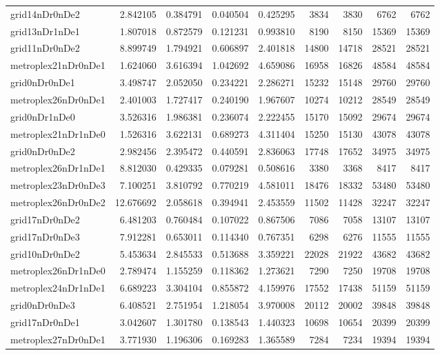 \begin{longtable}{|l|r|r|r|r|r|r|r|r|}
grid14nDr0nDe2 & 2.842105 & 0.384791 & 0.040504 & 0.425295 & 3834 & 3830 & 6762 & 6762 \\
grid13nDr1nDe1 & 1.807018 & 0.872579 & 0.121231 & 0.993810 & 8190 & 8150 & 15369 & 15369 \\
grid11nDr0nDe2 & 8.899749 & 1.794921 & 0.606897 & 2.401818 & 14800 & 14718 & 28521 & 28521 \\
metroplex21nDr0nDe1 & 1.624060 & 3.616394 & 1.042692 & 4.659086 & 16958 & 16826 & 48584 & 48584 \\
grid0nDr0nDe1 & 3.498747 & 2.052050 & 0.234221 & 2.286271 & 15232 & 15148 & 29760 & 29760 \\
metroplex26nDr0nDe1 & 2.401003 & 1.727417 & 0.240190 & 1.967607 & 10274 & 10212 & 28549 & 28549 \\
grid0nDr1nDe0 & 3.526316 & 1.986381 & 0.236074 & 2.222455 & 15170 & 15092 & 29674 & 29674 \\
metroplex21nDr1nDe0 & 1.526316 & 3.622131 & 0.689273 & 4.311404 & 15250 & 15130 & 43078 & 43078 \\
grid0nDr0nDe2 & 2.982456 & 2.395472 & 0.440591 & 2.836063 & 17748 & 17652 & 34975 & 34975 \\
metroplex26nDr1nDe1 & 8.812030 & 0.429335 & 0.079281 & 0.508616 & 3380 & 3368 & 8417 & 8417 \\
metroplex23nDr0nDe3 & 7.100251 & 3.810792 & 0.770219 & 4.581011 & 18476 & 18332 & 53480 & 53480 \\
metroplex26nDr0nDe2 & 12.676692 & 2.058618 & 0.394941 & 2.453559 & 11502 & 11428 & 32247 & 32247 \\
grid17nDr0nDe2 & 6.481203 & 0.760484 & 0.107022 & 0.867506 & 7086 & 7058 & 13107 & 13107 \\
grid17nDr0nDe3 & 7.912281 & 0.653011 & 0.114340 & 0.767351 & 6298 & 6276 & 11555 & 11555 \\
grid10nDr0nDe2 & 5.453634 & 2.845533 & 0.513688 & 3.359221 & 22028 & 21922 & 43682 & 43682 \\
metroplex26nDr1nDe0 & 2.789474 & 1.155259 & 0.118362 & 1.273621 & 7290 & 7250 & 19708 & 19708 \\
metroplex24nDr1nDe1 & 6.689223 & 3.304104 & 0.855872 & 4.159976 & 17552 & 17438 & 51159 & 51159 \\
grid0nDr0nDe3 & 6.408521 & 2.751954 & 1.218054 & 3.970008 & 20112 & 20002 & 39848 & 39848 \\
grid17nDr0nDe1 & 3.042607 & 1.301780 & 0.138543 & 1.440323 & 10698 & 10654 & 20399 & 20399 \\
metroplex27nDr0nDe1 & 3.771930 & 1.196306 & 0.169283 & 1.365589 & 7284 & 7234 & 19394 & 19394 \\

\end{longtable}
